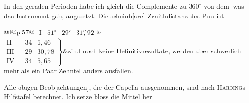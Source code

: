 In den geraden Perioden habe ich gleich die Complemente zu \(360^\circ\) von dem, was das Instrument gab, angesetzt. Die scheinb[are] Zenithdistanz des Pols ist
\begin{center}\begingroup\setlength{\tabcolsep}{3pt}
\begin{tabular}{@{}l@{\quad}p{}@{}}
\(\begin{array}{rrrr}\mathrm{I}&51^\circ&29'&31\overset{\prime\prime}{,}92\end{array}\)&\\
\(\left.\begin{array}{rrrr}\mathrm{II}&&34&6{,}46\\\mathrm{III}&&29&30{,}78\\\mathrm{IV}&&34&6{,}65\end{array}\right\}\)&sind noch keine Definitivresultate, werden aber schwerlich mehr als ein Paar Zehntel anders ausfallen\begingroup\renewcommand{\thefootnote}{**)}\footnotemark\endgroup.
\end{tabular}\par\endgroup\end{center}
\begingroup\renewcommand{\thefootnote}{**)}\endgroup
\clearpage{}
\noindent\hspace*{\parindent}Alle obigen Beob[achtungen], die der Capella ausgenommen, sind nach \textsc{Harding}s Hilfstafel berechnet. Ich setze bloss die Mittel her\begingroup\renewcommand{\thefootnote}{*)}\footnotemark{}\endgroup:
